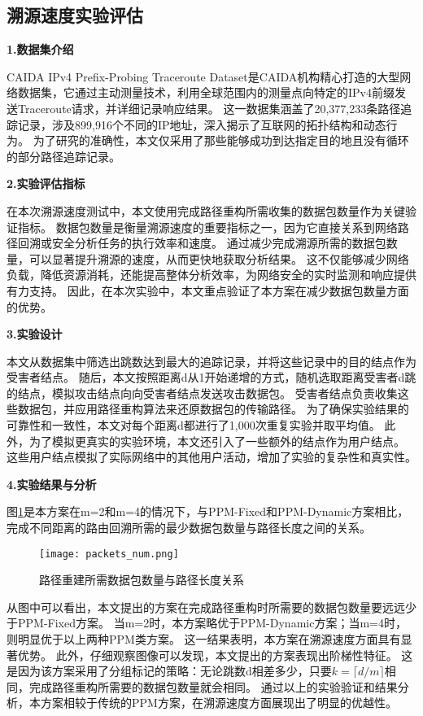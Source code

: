 \subsection{溯源速度实验评估}
\textbf{1.数据集介绍}\par
CAIDA IPv4 Prefix-Probing Traceroute Dataset是CAIDA机构精心打造的大型网络数据集，它通过主动测量技术，利用全球范围内的测量点向特定的IPv4前缀发送Traceroute请求，并详细记录响应结果。
这一数据集涵盖了20,377,233条路径追踪记录，涉及899,916个不同的IP地址，深入揭示了互联网的拓扑结构和动态行为。
为了研究的准确性，本文仅采用了那些能够成功到达指定目的地且没有循环的部分路径追踪记录。
\par
\textbf{2.实验评估指标}\par
在本次溯源速度测试中，本文使用完成路径重构所需收集的数据包数量作为关键验证指标。
数据包数量是衡量溯源速度的重要指标之一，因为它直接关系到网络路径回溯或安全分析任务的执行效率和速度。
通过减少完成溯源所需的数据包数量，可以显著提升溯源的速度，从而更快地获取分析结果。
这不仅能够减少网络负载，降低资源消耗，还能提高整体分析效率，为网络安全的实时监测和响应提供有力支持。
因此，在本次实验中，本文重点验证了本方案在减少数据包数量方面的优势。\par

\textbf{3.实验设计}\par
本文从数据集中筛选出跳数达到最大的追踪记录，并将这些记录中的目的结点作为受害者结点。
随后，本文按照距离d从1开始递增的方式，随机选取距离受害者d跳的结点，模拟攻击结点向向受害者结点发送攻击数据包。
受害者结点负责收集这些数据包，并应用路径重构算法来还原数据包的传输路径。
为了确保实验结果的可靠性和一致性，本文对每个距离d都进行了1,000次重复实验并取平均值。
此外，为了模拟更真实的实验环境，本文还引入了一些额外的结点作为用户结点。
这些用户结点模拟了实际网络中的其他用户活动，增加了实验的复杂性和真实性。\par

\textbf{4.实验结果与分析}\par
图\ref{fig:packets_num}是本方案在m=2和m=4的情况下，与PPM-Fixed和PPM-Dynamic方案相比，完成不同距离的路由回溯所需的最少数据包数量与路径长度之间的关系。
\begin{figure}[htbp]
	\centering
	\texttt{[image: packets\_num.png]}
	\caption{路径重建所需数据包数量与路径长度关系}
	\label{fig:packets_num}
\end{figure}
从图中可以看出，本文提出的方案在完成路径重构时所需要的数据包数量要远远少于PPM-Fixed方案。
当m=2时，本方案略优于PPM-Dynamic方案；当m=4时，则明显优于以上两种PPM类方案。
这一结果表明，本方案在溯源速度方面具有显著优势。
此外，仔细观察图像可以发现，本文提出的方案表现出阶梯性特征。
这是因为该方案采用了分组标记的策略：无论跳数d相差多少，只要$k=\lceil d/m \rceil$相同，完成路径重构所需要的数据包数量就会相同。
通过以上的实验验证和结果分析，本方案相较于传统的PPM方案，在溯源速度方面展现出了明显的优越性。\par

